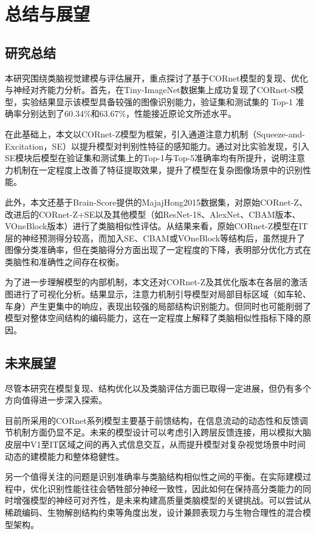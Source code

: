 \chapter{总结与展望}

\section{研究总结}

本研究围绕类脑视觉建模与评估展开，重点探讨了基于CORnet模型的复现、优化与神经对齐能力分析。首先，在Tiny-ImageNet数据集上成功复现了CORnet-S模型，实验结果显示该模型具备较强的图像识别能力，验证集和测试集的 Top-1 准确率分别达到了60.34\%和63.67\%，性能接近原论文所述水平。

在此基础上，本文以CORnet-Z模型为框架，引入通道注意力机制（Squeeze-and-Excitation，SE）以提升模型对判别性特征的感知能力。通过对比实验发现，引入SE模块后模型在验证集和测试集上的Top-1与Top-5准确率均有所提升，说明注意力机制在一定程度上改善了特征提取效果，提升了模型在复杂图像场景中的识别性能。

此外，本文还基于Brain-Score提供的MajajHong2015数据集，对原始CORnet-Z、改进后的CORnet-Z+SE以及其他模型（如ResNet-18、AlexNet、CBAM版本、VOneBlock版本）进行了类脑相似性评估。从结果来看，原始CORnet-Z模型在IT层的神经预测得分较高，而加入SE、CBAM或VOneBlock等结构后，虽然提升了图像分类准确率，但在类脑得分方面出现了一定程度的下降，表明部分优化方式在类脑性和准确性之间存在权衡。

为了进一步理解模型的内部机制，本文还对CORnet-Z及其优化版本在各层的激活图进行了可视化分析。结果显示，注意力机制引导模型对局部目标区域（如车轮、车身）产生更集中的响应，表现出较强的局部结构识别能力。但同时也可能削弱了模型对整体空间结构的编码能力，这在一定程度上解释了类脑相似性指标下降的原因。

\section{未来展望}

尽管本研究在模型复现、结构优化以及类脑评估方面已取得一定进展，但仍有多个方向值得进一步深入探索。

目前所采用的CORnet系列模型主要基于前馈结构，在信息流动的动态性和反馈调节机制方面仍显不足。未来的模型设计可以考虑引入跨层反馈连接，用以模拟大脑皮层中V1至IT区域之间的再入式信息交互，从而提升模型对复杂视觉场景中时间动态的建模能力和整体稳健性。

另一个值得关注的问题是识别准确率与类脑结构相似性之间的平衡。在实际建模过程中，优化识别性能往往会牺牲部分神经一致性，因此如何在保持高分类能力的同时增强模型的神经可对齐性，是未来构建高质量类脑模型的关键挑战。可以尝试从稀疏编码、生物解剖结构约束等角度出发，设计兼顾表现力与生物合理性的混合模型架构。

